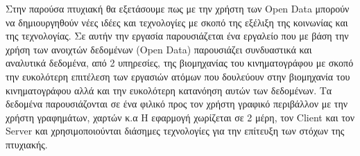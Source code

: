 \begin{Abstract}
Στην παρούσα πτυχιακή θα εξετάσουμε πως με την χρήστη των Open Data μπορούν να δημιουργηθούν νέες ιδέες και τεχνολογίες με σκοπό της εξέλιξη της κοινωνίας και της τεχνολογίας. 
Σε αυτήν την εργασία παρουσιάζεται ένα εργαλείο που με βάση την χρήση των ανοιχτών δεδομένων (Open Data) παρουσιάζει συνδυαστικά και αναλυτικά δεδομένα, από 2 υπηρεσίες, της βιομηχανίας του κινηματογράφου με σκοπό την ευκολότερη επιτέλεση των εργασιών ατόμων που δουλεύουν στην βιομηχανία του κινηματογράφου αλλά και την ευκολότερη κατανόηση αυτών των δεδομένων. Τα δεδομένα παρουσιάζονται σε ένα φιλικό προς τον χρήστη γραφικό περιβάλλον με την χρήστη γραφημάτων, χαρτών κ.α
Η εφαρμογή χωρίζεται σε 2 μέρη, τον Client και τον Server και χρησιμοποιούνται διάσημες τεχνολογίες για την επίτευξη των στόχων της πτυχιακής.
\end{Abstract}